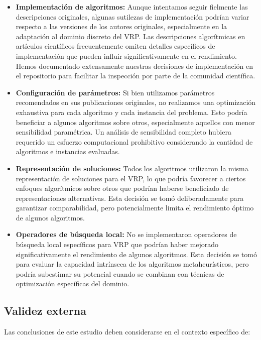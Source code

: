 \documentclass[conference,a4paper]{IEEEtran}
\begin{document}
\begin{itemize}
\item \textbf{Implementación de algoritmos:} Aunque intentamos seguir fielmente las descripciones originales, algunas sutilezas de implementación podrían variar respecto a las versiones de los autores originales, especialmente en la adaptación al dominio discreto del VRP. Las descripciones algorítmicas en artículos científicos frecuentemente omiten detalles específicos de implementación que pueden influir significativamente en el rendimiento. Hemos documentado extensamente nuestras decisiones de implementación en el repositorio para facilitar la inspección por parte de la comunidad científica.

\item \textbf{Configuración de parámetros:} Si bien utilizamos parámetros recomendados en sus publicaciones originales, no realizamos una optimización exhaustiva para cada algoritmo y cada instancia del problema. Esto podría beneficiar a algunos algoritmos sobre otros, especialmente aquellos con menor sensibilidad paramétrica. Un análisis de sensibilidad completo hubiera requerido un esfuerzo computacional prohibitivo considerando la cantidad de algoritmos e instancias evaluadas.

\item \textbf{Representación de soluciones:} Todos los algoritmos utilizaron la misma representación de soluciones para el VRP, lo que podría favorecer a ciertos enfoques algorítmicos sobre otros que podrían haberse beneficiado de representaciones alternativas. Esta decisión se tomó deliberadamente para garantizar comparabilidad, pero potencialmente limita el rendimiento óptimo de algunos algoritmos.

\item \textbf{Operadores de búsqueda local:} No se implementaron operadores de búsqueda local específicos para VRP que podrían haber mejorado significativamente el rendimiento de algunos algoritmos. Esta decisión se tomó para evaluar la capacidad intrínseca de los algoritmos metaheurísticos, pero podría subestimar su potencial cuando se combinan con técnicas de optimización específicas del dominio.
\end{itemize}

\subsection{Validez externa}

Las conclusiones de este estudio deben considerarse en el contexto específico de:
\end{document}
